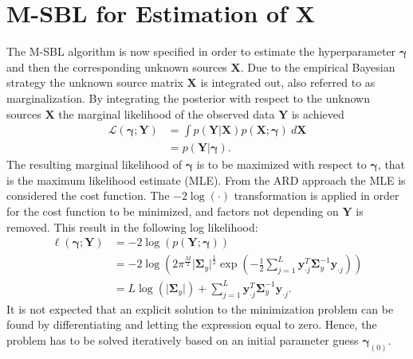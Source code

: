 \section{M-SBL for Estimation of $\mathbf{X}$}\label{seg:M_sblalg}
The M-SBL algorithm is now specified in order to estimate the hyperparameter $\boldsymbol{\gamma}$ and then the corresponding unknown sources $\mathbf{X}$.
Due to the empirical Bayesian strategy the unknown source matrix $\mathbf{X}$ is integrated out, also referred to as marginalization.
By integrating the posterior with respect to the unknown sources $\mathbf{X}$ the marginal likelihood of the observed data $\mathbf{Y}$ is achieved \cite[p. 146]{phd_wipf} 
\begin{align*}
\mathcal{L}(\boldsymbol{\gamma};\textbf{Y}) &= \int p (\mathbf{Y} \vert \mathbf{X}) p (\mathbf{X} ; \boldsymbol{\gamma}) \ d\mathbf{X} \\
&= p (\mathbf{Y} \vert \boldsymbol{\gamma}).
\end{align*}
The resulting marginal likelihood of $\boldsymbol{\gamma}$ is to be maximized with respect to $\boldsymbol{\gamma}$, that is the maximum likelihood estimate (MLE). 
From the ARD approach the MLE is considered the cost function. 
The $-2 \log (\cdot)$ transformation is applied in order for the cost function to be minimized, and factors not depending on $\mathbf{Y}$ is removed. This result in the following log likelihood: 
\begin{align}
\ell(\boldsymbol{\gamma};\textbf{Y})&= - 2 \log(p (\mathbf{Y} ; \boldsymbol{\gamma}))\nonumber \\ 
&= -2\log \left( 2\pi^{\frac{M}{2}}\vert \boldsymbol{\Sigma}_{y}\vert^{\frac{1}{2}}\exp \left( - \frac{1}{2} \sum_{j=1}^L \textbf{y}_{\cdot j}^T \boldsymbol{\Sigma}_{y}^{-1} \textbf{y}_{\cdot j} \right) \right)\nonumber \\
&= L \log ( \vert \boldsymbol{\Sigma}_y \vert ) + \sum_{j=1}^L \mathbf{y}_{\cdot j}^T \boldsymbol{\Sigma}_y ^{-1} \mathbf{y}_{\cdot j}.\label{eq:likelihood}
\end{align}
It is not expected that an explicit solution to the minimization problem can be found by differentiating and letting the expression equal to zero. 
Hence, the problem has to be solved iteratively based on an initial parameter guess $\boldsymbol{\gamma}_{(0)}$.


